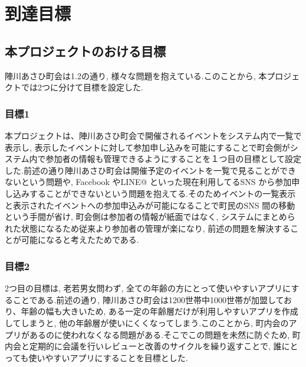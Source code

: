 \chapter{到達目標}

\section{本プロジェクトのおける目標}
  陣川あさひ町会は1.2の通り, 様々な問題を抱えている.このことから, 本プロジェクトでは2つに分けて目標を設定した.

\subsection{目標1}
  本プロジェクトは、陣川あさひ町会で開催されるイベントをシステム内で一覧で表示し, 表示したイベントに対して参加申し込みを可能にすることで町会側がシステム内で参加者の情報も管理できるようにすることを１つ目の目標として設定した.前述の通り陣川あさひ町会は開催予定のイベントを一覧で見ることができないという問題や, Facebook やLINE@ といった現在利用してるSNS から参加申し込みすることができないという問題を抱えてる.そのためイベントの一覧表示と表示されたイベントへの参加申込みが可能になることで町民のSNS 間の移動という手間が省け, 町会側は参加者の情報が紙面ではなく, システムにまとめられた状態になるため従来より参加者の管理が楽になり, 前述の問題を解決することが可能になると考えたためである.\\

\subsection{目標2}
  2つ目の目標は, 老若男女問わず, 全ての年齢の方にとって使いやすいアプリにすることである.前述の通り, 陣川あさひ町会は1200世帯中1000世帯が加盟しており、年齢の幅も大きいため, ある一定の年齢層だけが利用しやすいアプリを作成してしまうと, 他の年齢層が使いにくくなってしまう.このことから, 町内会のアプリがあるのに使われなくなる問題がある.そこでこの問題を未然に防ぐため, 町内会と定期的に会議を行いレビューと改善のサイクルを繰り返すことで, 誰にとっても使いやすいアプリにすることを目標とした.\\


